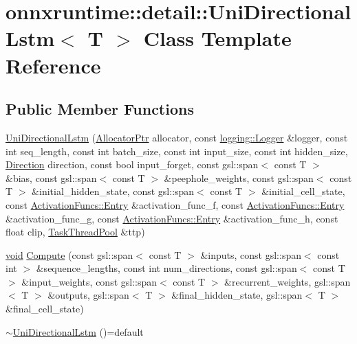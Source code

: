 \hypertarget{classonnxruntime_1_1detail_1_1UniDirectionalLstm}{}\section{onnxruntime\+:\+:detail\+:\+:Uni\+Directional\+Lstm$<$ T $>$ Class Template Reference}
\label{classonnxruntime_1_1detail_1_1UniDirectionalLstm}
\subsection*{Public Member Functions}
\begin{DoxyCompactItemize}
\item 
\mbox{\hyperlink{classonnxruntime_1_1detail_1_1UniDirectionalLstm_a8305997736890bded87cdb2b14cddd56}{Uni\+Directional\+Lstm}} (\mbox{\hyperlink{namespaceonnxruntime_a6cdac724c5dcefded3a63f08dae58fda}{Allocator\+Ptr}} allocator, const \mbox{\hyperlink{classonnxruntime_1_1logging_1_1Logger}{logging\+::\+Logger}} \&logger, const int seq\+\_\+length, const int batch\+\_\+size, const int input\+\_\+size, const int hidden\+\_\+size, \mbox{\hyperlink{namespaceonnxruntime_1_1rnn_1_1detail_a3a4cfb298df0a68436cdb8879647de1d}{Direction}} direction, const bool input\+\_\+forget, const gsl\+::span$<$ const T $>$ \&bias, const gsl\+::span$<$ const T $>$ \&peephole\+\_\+weights, const gsl\+::span$<$ const T $>$ \&initial\+\_\+hidden\+\_\+state, const gsl\+::span$<$ const T $>$ \&initial\+\_\+cell\+\_\+state, const \mbox{\hyperlink{structonnxruntime_1_1rnn_1_1detail_1_1ActivationFuncs_1_1Entry}{Activation\+Funcs\+::\+Entry}} \&activation\+\_\+func\+\_\+f, const \mbox{\hyperlink{structonnxruntime_1_1rnn_1_1detail_1_1ActivationFuncs_1_1Entry}{Activation\+Funcs\+::\+Entry}} \&activation\+\_\+func\+\_\+g, const \mbox{\hyperlink{structonnxruntime_1_1rnn_1_1detail_1_1ActivationFuncs_1_1Entry}{Activation\+Funcs\+::\+Entry}} \&activation\+\_\+func\+\_\+h, const float clip, \mbox{\hyperlink{classonnxruntime_1_1TaskThreadPool}{Task\+Thread\+Pool}} \&ttp)
\item 
\mbox{\hyperlink{mlasi_8h_a88f941d423cb2a819b70a1358982b1a6}{void}} \mbox{\hyperlink{classonnxruntime_1_1detail_1_1UniDirectionalLstm_a63b38c940bfa73e61b756af810677b5b}{Compute}} (const gsl\+::span$<$ const T $>$ \&inputs, const gsl\+::span$<$ const int $>$ \&sequence\+\_\+lengths, const int num\+\_\+directions, const gsl\+::span$<$ const T $>$ \&input\+\_\+weights, const gsl\+::span$<$ const T $>$ \&recurrent\+\_\+weights, gsl\+::span$<$ T $>$ \&outputs, gsl\+::span$<$ T $>$ \&final\+\_\+hidden\+\_\+state, gsl\+::span$<$ T $>$ \&final\+\_\+cell\+\_\+state)
\item 
\mbox{\hyperlink{classonnxruntime_1_1detail_1_1UniDirectionalLstm_a89f068ebc2f0614ffc238e0d6f7fe086}{$\sim$\+Uni\+Directional\+Lstm}} ()=default
\end{DoxyCompactItemize}


